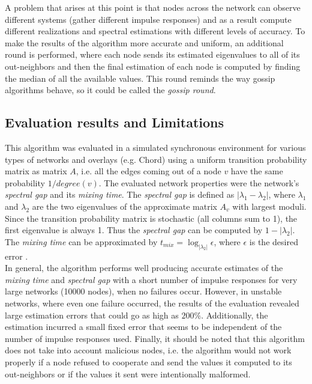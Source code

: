 \documentclass[a4paper,11pt,twoside]{report}
\begin{document}
A problem that arises at this point is that nodes across the network can observe different systems (gather different impulse responses) and as a result compute different realizations and spectral estimations with different levels of accuracy. To make the results of the algorithm more accurate and uniform, an additional round is performed, where each node sends its estimated eigenvalues to all of its out-neighbors and then the final estimation of each node is computed by finding the median of all the available values. This round reminds the way gossip algorithms behave, so it could be called the \textit{gossip round}.

\subsection{Evaluation results and Limitations}

This algorithm was evaluated in a simulated synchronous environment for various types of networks and overlays (e.g. Chord) using a uniform transition probability matrix as matrix $A$, i.e. all the edges coming out of a node $v$ have the same probability $1/degree(v)$. The evaluated network properties were the network's \textit{spectral gap} and its \textit{mixing time}. The \textit{spectral gap} is defined as $|\lambda_1 - \lambda_2|$, where $\lambda_1$ and $\lambda_2$ are the two eigenvalues of the approximate matrix $A_v$ with largest moduli. Since the transition probability matrix is stochastic (all columns sum to 1), the first eigenvalue is always 1. Thus the \textit{spectral gap} can be computed by $1-|\lambda_2|$. The \textit{mixing time} can be approximated by $t_{mix} = \log _{|\lambda_2|}\epsilon$, where $\epsilon$ is the desired error \cite{Datta:2007:UDS:1270387.1270884} \cite{Snader:2009:ESP:1855663.1855672}.\\

In general, the algorithm performs well producing accurate estimates of the \textit{mixing time} and \textit{spectral gap} with a short number of impulse responses for very large networks (10000 nodes), when no failures occur. However, in unstable networks, where even one failure occurred, the results of the evaluation revealed large estimation errors that could go as high as $200 \%$. Additionally, the estimation incurred a small fixed error that seems to be independent of the number of impulse responses used. Finally, it should be noted that this algorithm does not take into account malicious nodes, i.e. the algorithm would not work properly if a node refused to cooperate and send the values it computed to its out-neighbors or if the values it sent were intentionally malformed. 
\end{document}
